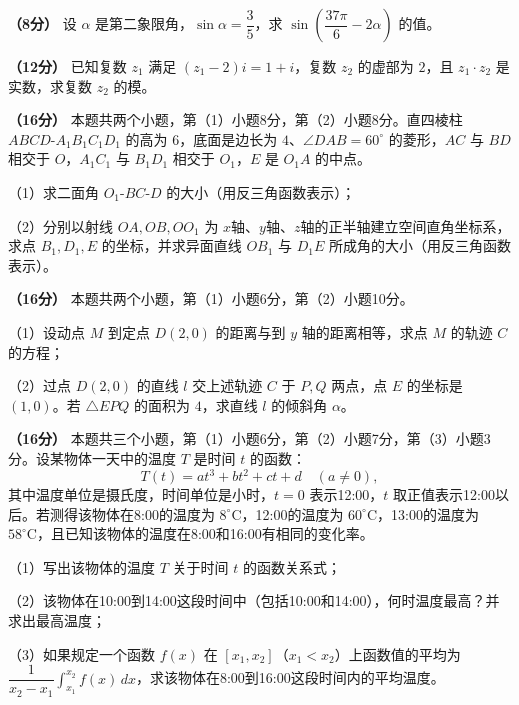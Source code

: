 \begin{question}
\textbf{（8分）} 设 $\alpha$ 是第二象限角，$\sin\alpha=\dfrac35$，求 $\sin\left(\dfrac{37\pi}{6}-2\alpha\right)$ 的值。

\end{question}
\begin{question}
\textbf{（12分）} 已知复数 $z_1$ 满足 $(z_1-2)i=1+i$，复数 $z_2$ 的虚部为 $2$，且 $z_1\cdot z_2$ 是实数，求复数 $z_2$ 的模。

\Needspace{0.4\textheight}
\end{question}
\begin{question}
\textbf{（16分）} 本题共两个小题，第（1）小题8分，第（2）小题8分。直四棱柱 $ABCD\text{-}A_1B_1C_1D_1$ 的高为 $6$，底面是边长为 $4$、$\angle DAB=60^\circ$ 的菱形，$AC$ 与 $BD$ 相交于 $O$，$A_1C_1$ 与 $B_1D_1$ 相交于 $O_1$，$E$ 是 $O_1A$ 的中点。

（1）求二面角 $O_1\text{-}BC\text{-}D$ 的大小（用反三角函数表示）；

（2）分别以射线 $OA,OB,OO_1$ 为 $x$轴、$y$轴、$z$轴的正半轴建立空间直角坐标系，求点 $B_1,D_1,E$ 的坐标，并求异面直线 $OB_1$ 与 $D_1E$ 所成角的大小（用反三角函数表示）。
\nopagebreak[4]
\begin{center}\end{center}
\nopagebreak[4]
\end{question}
\begin{question}
\textbf{（16分）} 本题共两个小题，第（1）小题6分，第（2）小题10分。

（1）设动点 $M$ 到定点 $D(2,0)$ 的距离与到 $y$ 轴的距离相等，求点 $M$ 的轨迹 $C$ 的方程；

（2）过点 $D(2,0)$ 的直线 $l$ 交上述轨迹 $C$ 于 $P,Q$ 两点，点 $E$ 的坐标是 $(1,0)$。若 $\triangle EPQ$ 的面积为 $4$，求直线 $l$ 的倾斜角 $\alpha$。

\end{question}
\begin{question}
\textbf{（16分）} 本题共三个小题，第（1）小题6分，第（2）小题7分，第（3）小题3分。设某物体一天中的温度 $T$ 是时间 $t$ 的函数：
\nopagebreak[4]
\[
T(t)=at^3+bt^2+ct+d\quad(a\ne0),
\]
其中温度单位是摄氏度，时间单位是小时，$t=0$ 表示12:00，$t$ 取正值表示12:00以后。若测得该物体在8:00的温度为 $8^\circ\mathrm C$，12:00的温度为 $60^\circ\mathrm C$，13:00的温度为 $58^\circ\mathrm C$，且已知该物体的温度在8:00和16:00有相同的变化率。

（1）写出该物体的温度 $T$ 关于时间 $t$ 的函数关系式；

（2）该物体在10:00到14:00这段时间中（包括10:00和14:00），何时温度最高？并求出最高温度；

（3）如果规定一个函数 $f(x)$ 在 $[x_1,x_2]$（$x_1<x_2$）上函数值的平均为 $\dfrac1{x_2-x_1}\int_{x_1}^{x_2}f(x)\,dx$，求该物体在8:00到16:00这段时间内的平均温度。

\end{question}
